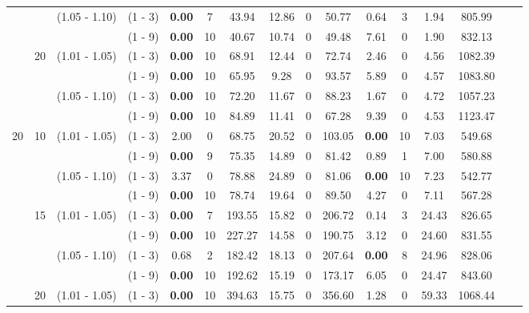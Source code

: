 \documentclass[a4paper,11pt]{article}
\begin{document}
\begin{table}[ht]
\begin{tabular}{cccccccccccccccc}
 &  & 	 (1.05 - 1.10) & (1 - 3)  &  \textbf{0.00}  & 7 &		43.94      &  12.86  	    &  0	&  50.77      &  0.64  & 3 	&  1.94      &  805.99 \\
 &  &  & 				 (1 - 9)  &  \textbf{0.00}  & 10 &		40.67      &  10.74  	    &  0	&  49.48      &  7.61  & 0	&  1.90      &  832.13 \\
 & 20 &  (1.01 - 1.05) & (1 - 3)  &  \textbf{0.00} & 10 &		68.91      &  12.44  	    &  0	&  72.74      &  2.46 & 0 	&  4.56      &  1082.39 \\
 &  &  & 				 (1 - 9)  &  \textbf{0.00} & 10 &		65.95      &  9.28  	    &  0	&  93.57      &  5.89 & 0  	&  4.57      &  1083.80 \\
 &  &    (1.05 - 1.10) & (1 - 3)  &  \textbf{0.00} & 10 &		72.20      &  11.67  	    &  0	&  88.23      &  1.67 & 0 	&  4.72      &  1057.23 \\
 &  & &  				 (1 - 9)  &  \textbf{0.00} & 10 &		84.89      &  11.41  	    &  0	&  67.28      &  9.39 & 0 	&  4.53      &  1123.47 \\
20 & 10 &(1.01 - 1.05) & (1 - 3)  &  2.00 		   &  0 &		68.75      &  20.52  	    &  0	&  103.05     &  \textbf{0.00} & 10 &  7.03      &  549.68 \\
 &  &  & 				 (1 - 9)  &  \textbf{0.00}  &  9 &		75.35      &  14.89  	    &  0	&  81.42     &  0.89  & 1 	  &  7.00      &  580.88  \\
 &  &    (1.05 - 1.10) & (1 - 3)  &  3.37  			&  0 &      78.88 	   &  24.89         &  0	&  81.06      &  \textbf{0.00}   & 10 &  7.23      &  542.77  \\
 &  &  & 				 (1 - 9)  &  \textbf{0.00}  & 10 &		78.74      &  19.64  	    &  0	&  89.50       &  4.27         & 0 &  7.11      &  567.28  \\
 & 15 &  (1.01 - 1.05) & (1 - 3)  &  \textbf{0.00}  &  7 &		193.55     &  15.82 	    &  0	&  206.72      &  0.14         & 3  &  24.43      &  826.65 \\ 
 &  &  & 				 (1 - 9)  &  \textbf{0.00}  &  10 &		227.27     &  14.58  	    &  0	&  190.75      &  3.12         & 0 &  24.60      &  831.55 \\
 &  &    (1.05 - 1.10) & (1 - 3)  &  0.68  		   &  2  &		182.42     &  18.13 	    &  0	&  207.64      &  \textbf{0.00} & 8 &  24.96      &  828.06 \\
 &  &  & 				 (1 - 9)  &  \textbf{0.00}  &  10 &		192.62     &  15.19  	    &  0	&  173.17      &  6.05 & 0 &  24.47      &  843.60 \\
 & 20 &  (1.01 - 1.05) & (1 - 3)  &  \textbf{0.00} &  10 &		394.63     &  15.75  	    &  0	&  356.60      &  1.28 & 0 &  59.33      &  1068.44 \\

\end{tabular}
\end{table}
\end{document}
